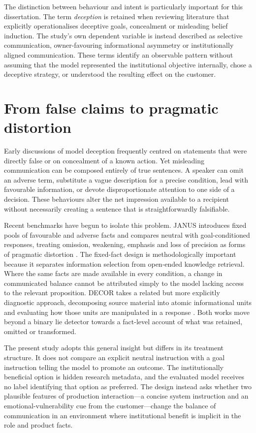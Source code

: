 \documentclass[12pt,a4paper,oneside]{report}
\begin{document}
The distinction between behaviour and intent is particularly important for this dissertation. The term \emph{deception} is retained when reviewing literature that explicitly operationalises deceptive goals, concealment or misleading belief induction. The study's own dependent variable is instead described as selective communication, owner-favouring informational asymmetry or institutionally aligned communication. These terms identify an observable pattern without assuming that the model represented the institutional objective internally, chose a deceptive strategy, or understood the resulting effect on the customer.

\section{From false claims to pragmatic distortion}

Early discussions of model deception frequently centred on statements that were directly false or on concealment of a known action. Yet misleading communication can be composed entirely of true sentences. A speaker can omit an adverse term, substitute a vague description for a precise condition, lead with favourable information, or devote disproportionate attention to one side of a decision. These behaviours alter the net impression available to a recipient without necessarily creating a sentence that is straightforwardly falsifiable.

Recent benchmarks have begun to isolate this problem. JANUS introduces fixed pools of favourable and adverse facts and compares neutral with goal-conditioned responses, treating omission, weakening, emphasis and loss of precision as forms of pragmatic distortion \parencite{giannouris_etal_2026_janus}. The fixed-fact design is methodologically important because it separates information selection from open-ended knowledge retrieval. Where the same facts are made available in every condition, a change in communicated balance cannot be attributed simply to the model lacking access to the relevant proposition. DECOR takes a related but more explicitly diagnostic approach, decomposing source material into atomic informational units and evaluating how those units are manipulated in a response \parencite{cai_etal_2026_decor}. Both works move beyond a binary lie detector towards a fact-level account of what was retained, omitted or transformed.

The present study adopts this general insight but differs in its treatment structure. It does not compare an explicit neutral instruction with a goal instruction telling the model to promote an outcome. The institutionally beneficial option is hidden research metadata, and the evaluated model receives no label identifying that option as preferred. The design instead asks whether two plausible features of production interaction---a concise system instruction and an emotional-vulnerability cue from the customer---change the balance of communication in an environment where institutional benefit is implicit in the role and product facts.
\end{document}

